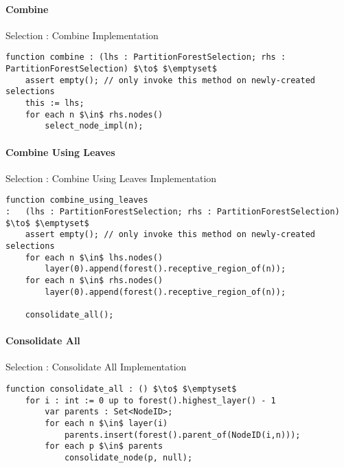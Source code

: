 \paragraph{Combine}

\begin{stulisting}[H]
\caption{Selection : Combine Implementation}
\begin{lstlisting}[style=Default]
function combine : (lhs : PartitionForestSelection; rhs : PartitionForestSelection) $\to$ $\emptyset$
	assert empty();	// only invoke this method on newly-created selections
	this := lhs;
	for each n $\in$ rhs.nodes()
		select_node_impl(n);
\end{lstlisting}
\end{stulisting}

\paragraph{Combine Using Leaves}

\begin{stulisting}[H]
\caption{Selection : Combine Using Leaves Implementation}
\begin{lstlisting}[style=Default]
function combine_using_leaves
:	(lhs : PartitionForestSelection; rhs : PartitionForestSelection) $\to$ $\emptyset$
	assert empty();	// only invoke this method on newly-created selections
	for each n $\in$ lhs.nodes()
		layer(0).append(forest().receptive_region_of(n));
	for each n $\in$ rhs.nodes()
		layer(0).append(forest().receptive_region_of(n));

	consolidate_all();
\end{lstlisting}
\end{stulisting}

\paragraph{Consolidate All}

\begin{stulisting}[H]
\caption{Selection : Consolidate All Implementation}
\begin{lstlisting}[style=Default]
function consolidate_all : () $\to$ $\emptyset$
	for i : int := 0 up to forest().highest_layer() - 1
		var parents : Set<NodeID>;
		for each n $\in$ layer(i)
			parents.insert(forest().parent_of(NodeID(i,n)));
		for each p $\in$ parents
			consolidate_node(p, null);
\end{lstlisting}
\end{stulisting}

